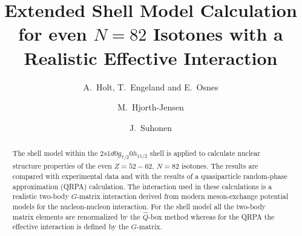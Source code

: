 
\title{Extended Shell Model Calculation for even $N=82$ Isotones with a 
Realistic Effective Interaction}

\author{A.\ Holt, T.\ Engeland and E.\ Osnes}

\address{Department of Physics, University of Oslo, N-0316 Oslo, Norway}

\author{M.\ Hjorth-Jensen}

\address{Nordita, Blegdamsvej 17, DK-2100 K\o benhavn \O, Denmark}

\author{J.\ Suhonen}

\address{Department of Physics, University of Jyv\"{a}skyl\"{a},
              P.O.Box 35, FIN-40351 Jyv\"{a}skyl\"{a}, Finland}

\maketitle

\begin{abstract}
The shell model within the $2s1d0g_{7/2}0h_{11/2}$ shell is applied to 
calculate nuclear structure properties of the even $Z=52 - 62$, $N=82$ 
isotones. The results are compared with experimental data and with the 
results of a quasiparticle random-phase approximation (QRPA) calculation.
The interaction used in these calculations is a realistic 
two-body $G$-matrix
interaction derived from modern meson-exchange potential models for the
nucleon-nucleon interaction. 
For the shell model all the 
two-body matrix elements are renormalized by the $\hat{Q}$-box method 
whereas for the QRPA the effective interaction is defined 
by the $G$-matrix.
\end{abstract}

